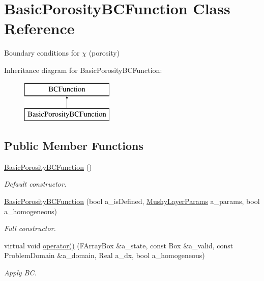 \hypertarget{class_basic_porosity_b_c_function}{\section{Basic\-Porosity\-B\-C\-Function Class Reference}
\label{class_basic_porosity_b_c_function}
}


Boundary conditions for $\chi$ (porosity)  


Inheritance diagram for Basic\-Porosity\-B\-C\-Function\-:\begin{figure}[H]
\begin{center}
\leavevmode
\includegraphics[height=2.000000cm]{class_basic_porosity_b_c_function}
\end{center}
\end{figure}
\subsection*{Public Member Functions}
\begin{DoxyCompactItemize}
\item 
\hypertarget{class_basic_porosity_b_c_function_aedeb2e53b464f1312303924072cfe17c}{\hyperlink{class_basic_porosity_b_c_function_aedeb2e53b464f1312303924072cfe17c}{Basic\-Porosity\-B\-C\-Function} ()}\label{class_basic_porosity_b_c_function_aedeb2e53b464f1312303924072cfe17c}

\begin{DoxyCompactList}\small\item\em Default constructor. \end{DoxyCompactList}\item 
\hypertarget{class_basic_porosity_b_c_function_a4aba1cc634f386017e9ada70547e3161}{\hyperlink{class_basic_porosity_b_c_function_a4aba1cc634f386017e9ada70547e3161}{Basic\-Porosity\-B\-C\-Function} (bool a\-\_\-is\-Defined, \hyperlink{class_mushy_layer_params}{Mushy\-Layer\-Params} a\-\_\-params, bool a\-\_\-homogeneous)}\label{class_basic_porosity_b_c_function_a4aba1cc634f386017e9ada70547e3161}

\begin{DoxyCompactList}\small\item\em Full constructor. \end{DoxyCompactList}\item 
\hypertarget{class_basic_porosity_b_c_function_aac953cefd894b590c5bcefd63df47685}{virtual void \hyperlink{class_basic_porosity_b_c_function_aac953cefd894b590c5bcefd63df47685}{operator()} (F\-Array\-Box \&a\-\_\-state, const Box \&a\-\_\-valid, const Problem\-Domain \&a\-\_\-domain, Real a\-\_\-dx, bool a\-\_\-homogeneous)}\label{class_basic_porosity_b_c_function_aac953cefd894b590c5bcefd63df47685}

\begin{DoxyCompactList}\small\item\em Apply B\-C. \end{DoxyCompactList}\end{DoxyCompactItemize}
